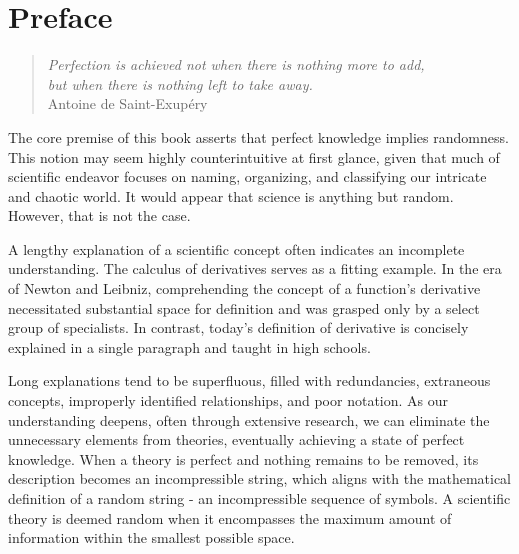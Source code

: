 %
%


\chapter*{Preface}

\begin{quote}
\begin{flushright}
\emph{Perfection is achieved not when there is nothing more to add, \\
but when there is nothing left to take away.}\\
Antoine de Saint-Exupéry\\
\end{flushright}
\end{quote}
\bigskip


The core premise of this book asserts that perfect knowledge implies randomness. This notion may seem highly counterintuitive at first glance, given that much of scientific endeavor focuses on naming, organizing, and classifying our intricate and chaotic world. It would appear that science is anything but random. However, that is not the case.

A lengthy explanation of a scientific concept often indicates an incomplete understanding. The calculus of derivatives serves as a fitting example. In the era of Newton and Leibniz, comprehending the concept of a function's derivative necessitated substantial space for definition and was grasped only by a select group of specialists. In contrast, today's definition of derivative is concisely explained in a single paragraph and taught in high schools.

Long explanations tend to be superfluous, filled with redundancies, extraneous concepts, improperly identified relationships, and poor notation. As our understanding deepens, often through extensive research, we can eliminate the unnecessary elements from theories, eventually achieving a state of perfect knowledge. When a theory is perfect and nothing remains to be removed, its description becomes an incompressible string, which aligns with the mathematical definition of a random string - an incompressible sequence of symbols. A scientific theory is deemed random when it encompasses the maximum amount of information within the smallest possible space.

